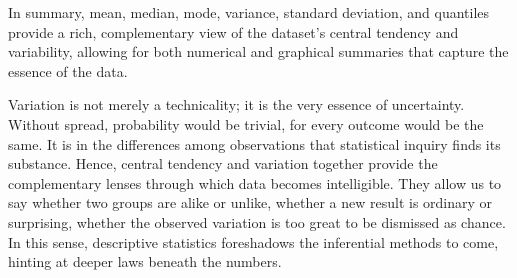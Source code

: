 \documentclass{book}
\begin{document}
In summary, mean, median, mode, variance, standard deviation, and quantiles provide a rich, complementary view of the dataset’s central tendency and variability, allowing for both numerical and graphical summaries that capture the essence of the data.

\medskip

Variation is not merely a technicality; it is the very essence of uncertainty. Without spread, probability would be trivial, for every outcome would be the same. It is in the differences among observations that statistical inquiry finds its substance. Hence, central tendency and variation together provide the complementary lenses through which data becomes intelligible. They allow us to say whether two groups are alike or unlike, whether a new result is ordinary or surprising, whether the observed variation is too great to be dismissed as chance. In this sense, descriptive statistics foreshadows the inferential methods to come, hinting at deeper laws beneath the numbers.
\end{document}

